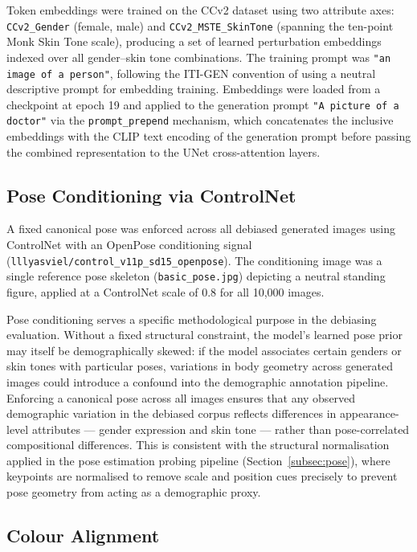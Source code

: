 Token embeddings were trained on the CCv2 dataset 
\cite{TODO_CCv2} using two attribute axes: 
\texttt{CCv2\_Gender} (female, male) and 
\texttt{CCv2\_MSTE\_SkinTone} (spanning the ten-point Monk 
Skin Tone scale), producing a set of learned perturbation 
embeddings indexed over all gender--skin tone combinations. 
The training prompt was \texttt{"an image of a person"}, 
following the ITI-GEN convention of using a neutral 
descriptive prompt for embedding training. Embeddings were 
loaded from a checkpoint at epoch 19 and applied to the 
generation prompt \texttt{"A picture of a doctor"} via the 
\texttt{prompt\_prepend} mechanism, which concatenates the 
inclusive embeddings with the CLIP text encoding of the 
generation prompt before passing the combined representation 
to the UNet cross-attention layers.

\subsection{Pose Conditioning via ControlNet}
\label{subsec:debias_controlnet}

A fixed canonical pose was enforced across all debiased 
generated images using ControlNet \cite{LZhang_2023_ControlNet} 
with an OpenPose conditioning signal 
(\texttt{lllyasviel/control\_v11p\_sd15\_openpose}). The 
conditioning image was a single reference pose skeleton 
(\texttt{basic\_pose.jpg}) depicting a neutral standing 
figure, applied at a ControlNet scale of 0.8 for all 
10{,}000 images.

Pose conditioning serves a specific methodological purpose 
in the debiasing evaluation. Without a fixed structural 
constraint, the model's learned pose prior may itself be 
demographically skewed: if the model associates certain 
genders or skin tones with particular poses, variations 
in body geometry across generated images could introduce 
a confound into the demographic annotation pipeline. 
Enforcing a canonical pose across all images ensures that 
any observed demographic variation in the debiased corpus 
reflects differences in appearance-level attributes --- 
gender expression and skin tone --- rather than 
pose-correlated compositional differences. This is 
consistent with the structural normalisation applied in 
the pose estimation probing pipeline 
(Section~\ref{subsec:pose}), where keypoints are 
normalised to remove scale and position cues precisely 
to prevent pose geometry from acting as a demographic 
proxy.

\subsection{Colour Alignment}
\label{subsec:colour_alignment}

